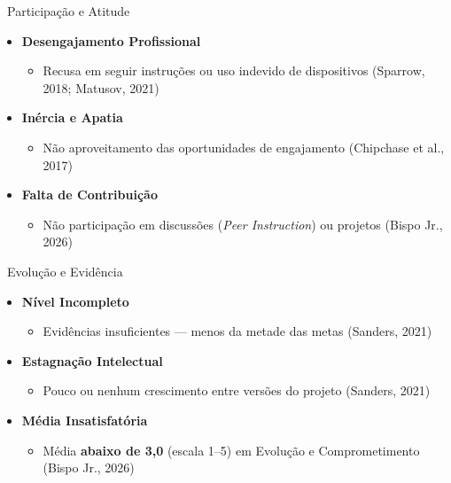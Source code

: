 \documentclass[xcolor=dvipsnames,table]{beamer}
\begin{document}
  \begin{frame}{\textcolor{white}{\faHandshake}\ Participação e Atitude}
    \begin{itemize}
      \item[\textcolor{BrickRed}{\faMobile}] \textbf{Desengajamento Profissional}
        \begin{itemize}
          \item Recusa em seguir instruções ou uso indevido de dispositivos
            {\small (Sparrow, 2018; Matusov, 2021)}
        \end{itemize}
      \pause
      \item[\textcolor{gray}{\faBed}] \textbf{Inércia e Apatia}
        \begin{itemize}
          \item Não aproveitamento das oportunidades de engajamento
            {\small (Chipchase et al., 2017)}
        \end{itemize}
      \pause
      \item[\textcolor{gray}{\faMicrophoneSlash}] \textbf{Falta de Contribuição}
        \begin{itemize}
          \item Não participação em discussões (\textit{Peer Instruction}) ou projetos
            {\small (Bispo Jr., 2026)}
        \end{itemize}
    \end{itemize}
  \end{frame}

  \begin{frame}{\textcolor{OliveGreen}{\faChartLine}\ Evolução e Evidência}
    \begin{itemize}
      \item[\textcolor{BrickRed}{\faChartBar}] \textbf{Nível Incompleto}
        \begin{itemize}
          \item Evidências insuficientes — menos da metade das metas {\small (Sanders, 2021)}
        \end{itemize}
      \pause
      \item[\textcolor{gray}{\faBed}] \textbf{Estagnação Intelectual}
        \begin{itemize}
          \item Pouco ou nenhum crescimento entre versões do projeto {\small (Sanders, 2021)}
        \end{itemize}
      \pause
      \item[\textcolor{BrickRed}{\faArrowDown}] \textbf{Média Insatisfatória}
        \begin{itemize}
          \item Média \textbf{abaixo de 3,0} (escala 1--5) em Evolução e Comprometimento
            {\small (Bispo Jr., 2026)}
        \end{itemize}
    \end{itemize}
  \end{frame}
\end{document}
